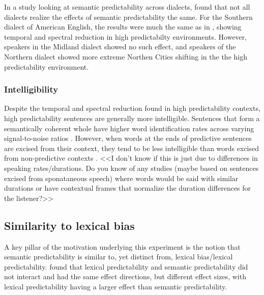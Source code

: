 In a study looking at semantic predictability across dialects, \citet{Clopper2008} found that not all dialects realize the effects of semantic predictability the same.  For the Southern dialect of American English, the results were much the same as in \citet{Scarborough2010}, showing temporal and spectral reduction in high predictabilty environments.  However, speakers in the Midland dialect showed no such effect, and speakers of the Northern dialect showed more extreme Northen Cities shifting in the the high predictability environment.

\subsubsection{Intelligibility}

Despite the temporal and spectral reduction found in high predictability contexts, high predictability sentences are generally more intelligible.  Sentences that form a semantically coherent whole have higher word identification rates across varying signal-to-noise ratios \citep{Kalikow1977}.  However, when words at the ends of predictive sentences are excised from their context, they tend to be less intelligible than words excised from non-predictive contexts \citep{Lieberman1963}.  <<I don't know if this is just due to differences in speaking rates/durations.  Do you know of any studies (maybe based on sentences excised from sponataneous speech) where words would be said with similar durations or have contextual frames that normalize the duration differences for the listener?>>

\subsection{Similarity to lexical bias}

A key pillar of the motivation underlying this experiment is the notion that semantic predictability is similar to, yet distinct from, lexical bias/lexical predictability.  \citet{Scarborough2010} found that lexical predictability and semantic predictability did not interact and had the same effect directions, but different effect sizes, with lexical predictability having a larger effect than semantic predictability.

